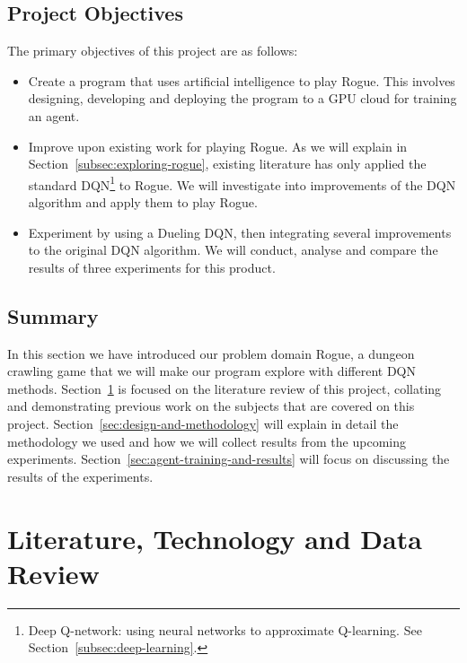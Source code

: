 \documentclass[12pt,a4paper]{article}
\begin{document}
    \subsection{Project Objectives}\label{subsec:objectives}
    The primary objectives of this project are as follows:
    \begin{itemize}
        \item Create a program that uses artificial intelligence to play Rogue.
        This involves designing, developing and deploying the program to a GPU cloud for training an agent.
        \item Improve upon existing work for playing Rogue.
        As we will explain in Section~\ref{subsec:exploring-rogue}, existing literature has only applied the standard
        DQN\footnote{Deep Q-network: using neural networks to approximate Q-learning. See Section~\ref{subsec:deep-learning}.} to Rogue.
        We will investigate into improvements of the DQN algorithm and apply them to play Rogue.
        \item Experiment by using a Dueling DQN, then integrating several improvements to the original DQN algorithm.
        We will conduct, analyse and compare the results of three experiments for this product.
    \end{itemize}

    \subsection{Summary}\label{subsec:summary1}
    In this section we have introduced our problem domain Rogue, a dungeon crawling game that we will make our program explore with different DQN methods.
    Section~\ref{sec:literature-technology-and-data-review} is focused on the literature review of
    this project, collating and demonstrating previous work on the subjects that are covered on this project.
    Section~\ref{sec:design-and-methodology} will explain in detail the methodology we used and how we will collect
    results from the upcoming experiments.
    Section~\ref{sec:agent-training-and-results} will focus on discussing the results of the experiments.

    \section{Literature, Technology and Data Review}\label{sec:literature-technology-and-data-review}
\end{document}
